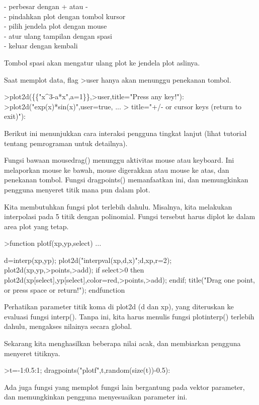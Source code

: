 \documentclass{article}
\begin{document}
\begin{eulernotebook}
\begin{eulercomment}
\begin{eulercomment}
\begin{eulercomment}
\begin{eulercomment}
\begin{eulercomment}
- perbesar dengan + atau -\\
- pindahkan plot dengan tombol kursor\\
- pilih jendela plot dengan mouse\\
- atur ulang tampilan dengan spasi\\
- keluar dengan kembali

Tombol spasi akan mengatur ulang plot ke jendela plot aslinya.

Saat memplot data, flag \textgreater{}user hanya akan menunggu penekanan tombol.
\end{eulercomment}
\begin{eulerprompt}
>plot2d(\{\{"x^3-a*x",a=1\}\},>user,title="Press any key!"):
>plot2d("exp(x)*sin(x)",user=true, ...
>  title="+/- or cursor keys (return to exit)"):
\end{eulerprompt}
\begin{eulercomment}
Berikut ini menunjukkan cara interaksi pengguna tingkat lanjut (lihat
tutorial tentang pemrograman untuk detailnya).

Fungsi bawaan mousedrag() menunggu aktivitas mouse atau keyboard. Ini
melaporkan mouse ke bawah, mouse digerakkan atau mouse ke atas, dan
penekanan tombol. Fungsi dragpoints() memanfaatkan ini, dan
memungkinkan pengguna menyeret titik mana pun dalam plot.

Kita membutuhkan fungsi plot terlebih dahulu. Misalnya, kita melakukan
interpolasi pada 5 titik dengan polinomial. Fungsi tersebut harus
diplot ke dalam area plot yang tetap.
\end{eulercomment}
\begin{eulerprompt}
>function plotf(xp,yp,select) ...
\end{eulerprompt}
\begin{eulerudf}
    d=interp(xp,yp);
    plot2d("interpval(xp,d,x)";d,xp,r=2);
    plot2d(xp,yp,>points,>add);
    if select>0 then
      plot2d(xp[select],yp[select],color=red,>points,>add);
    endif;
    title("Drag one point, or press space or return!");
  endfunction
\end{eulerudf}
\begin{eulercomment}
Perhatikan parameter titik koma di plot2d (d dan xp), yang diteruskan
ke evaluasi fungsi interp(). Tanpa ini, kita harus menulis fungsi
plotinterp() terlebih dahulu, mengakses nilainya secara global.

Sekarang kita menghasilkan beberapa nilai acak, dan membiarkan
pengguna menyeret titiknya.
\end{eulercomment}
\begin{eulerprompt}
>t=-1:0.5:1; dragpoints("plotf",t,random(size(t))-0.5):
\end{eulerprompt}
\begin{eulercomment}
Ada juga fungsi yang memplot fungsi lain bergantung pada vektor
parameter, dan memungkinkan pengguna menyesuaikan parameter ini.


\end{eulercomment}
\end{eulercomment}
\end{eulercomment}
\end{eulercomment}
\end{eulercomment}
\end{eulernotebook}
\end{document}
